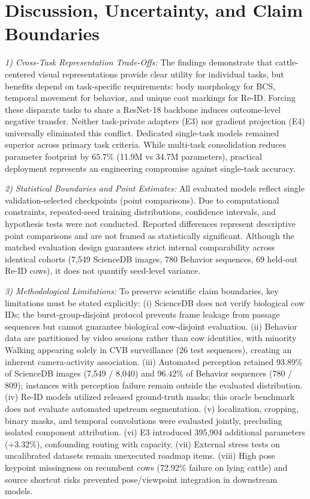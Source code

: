 \documentclass[conference]{IEEEtran}
\begin{document}
\section{Discussion, Uncertainty, and Claim Boundaries}
\textit{1) Cross-Task Representation Trade-Offs:} The findings demonstrate that cattle-centered visual representations provide clear utility for individual tasks, but benefits depend on task-specific requirements: body morphology for BCS, temporal movement for behavior, and unique coat markings for Re-ID. Forcing these disparate tasks to share a ResNet-18 backbone induces outcome-level negative transfer. Neither task-private adapters (E3) nor gradient projection (E4) universally eliminated this conflict. Dedicated single-task models remained superior across primary task criteria. While multi-task consolidation reduces parameter footprint by $65.7\%$ (11.9M vs 34.7M parameters), practical deployment represents an engineering compromise against single-task accuracy.

\textit{2) Statistical Boundaries and Point Estimates:} All evaluated models reflect single validation-selected checkpoints (point comparisons). Due to computational constraints, repeated-seed training distributions, confidence intervals, and hypothesis tests were not conducted. Reported differences represent descriptive point comparisons and are not framed as statistically significant. Although the matched evaluation design guarantees strict internal comparability across identical cohorts (7,549 ScienceDB images, 780 Behavior sequences, 69 held-out Re-ID cows), it does not quantify seed-level variance.

\textit{3) Methodological Limitations:} To preserve scientific claim boundaries, key limitations must be stated explicitly: (i) ScienceDB does not verify biological cow IDs; the burst-group-disjoint protocol prevents frame leakage from passage sequences but cannot guarantee biological cow-disjoint evaluation. (ii) Behavior data are partitioned by video sessions rather than cow identities, with minority Walking appearing solely in CVB surveillance (26 test sequences), creating an inherent camera-activity association. (iii) Automated perception retained 93.89\% of ScienceDB images (7,549 / 8,040) and 96.42\% of Behavior sequences (780 / 809); instances with perception failure remain outside the evaluated distribution. (iv) Re-ID models utilized released ground-truth masks; this oracle benchmark does not evaluate automated upstream segmentation. (v) localization, cropping, binary masks, and temporal convolutions were evaluated jointly, precluding isolated component attribution. (vi) E3 introduced 395,904 additional parameters (+3.32\%), confounding routing with capacity. (vii) External stress tests on uncalibrated datasets remain unexecuted roadmap items. (viii) High pose keypoint missingness on recumbent cows (72.92\% failure on lying cattle) and source shortcut risks prevented pose/viewpoint integration in downstream models.
\end{document}
